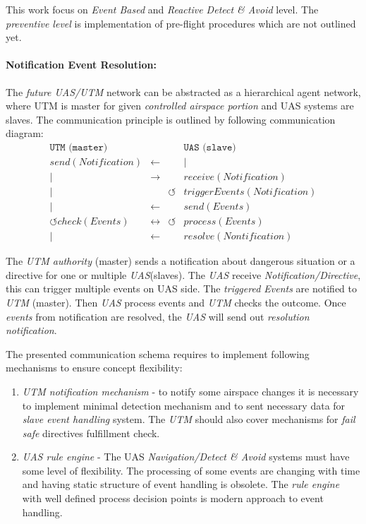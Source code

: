 This work focus on \emph{Event Based} and \emph{Reactive Detect \& Avoid} level. The \emph{preventive level} is implementation of pre-flight procedures which are not outlined yet.

\paragraph{Notification Event Resolution:} The \emph{future UAS/UTM} network can be abstracted as a hierarchical agent network, where UTM is master for given \emph{controlled airspace portion} and UAS systems are slaves. The communication principle is outlined by following communication diagram:
\begin{equation*}
    \begin{aligned}
         \texttt{UTM (master)}& & &  \texttt{UAS (slave)} \\
         send(Notification)&\longleftarrow&&|\\
         |&\longrightarrow  &&receive(Notification)\\
         |& & \circlearrowleft& triggerEvents(Notification)\\
         |& \longleftarrow && send(Events)\\
         \circlearrowleft check(Events)&\longleftrightarrow  &\circlearrowleft & process(Events)\\
         |&\longleftarrow&&resolve(Nontification)
    \end{aligned}
\end{equation*}

\noindent The \emph{UTM authority} (master) sends a notification about dangerous situation or a directive for one or multiple \emph{UAS}(slaves). The \emph{UAS} receive \emph{Notification/Directive}, this can trigger multiple events on UAS side. The \emph{triggered Events} are notified to \emph{UTM} (master). Then \emph{UAS} process events and \emph{UTM} checks the outcome. Once \emph{events} from notification are resolved, the \emph{UAS} will send out \emph{resolution notification}. 

The presented communication schema requires to implement following mechanisms to ensure concept flexibility:
\begin{enumerate}
    \item \emph{UTM notification mechanism} - to notify some airspace changes it is necessary to implement minimal detection mechanism and to sent necessary data for \emph{slave event handling} system. The \emph{UTM} should also cover mechanisms for \emph{fail safe} directives fulfillment check.
    
    \item \emph{UAS rule engine} - The UAS \emph{Navigation/Detect \& Avoid} systems must have some level of flexibility. The processing of some events are changing with time and having static structure of event handling is obsolete. The \emph{rule engine} with well defined process decision points is modern approach to event handling.
\end{enumerate}

